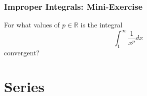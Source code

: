 \documentclass{beamer}
\begin{document}
\begin{frame}
\frametitle{Improper Integrals: Mini-Exercise}
For what values of $p \in \mathbb{R}$ is the integral
$$
\int_1^{\infty} \frac{1}{x^p} dx
$$
convergent?
\vspace*{1.2in}
\end{frame}


\section{Series}
%
\end{document}
